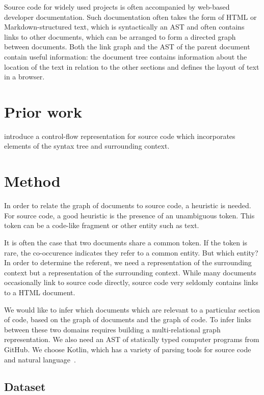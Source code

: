 \documentclass{article}
\begin{document}
Source code for widely used projects is often accompanied by web-based developer documentation. Such documentation often takes the form of HTML or Markdown-structured text, which is syntactically an AST and often contains links to other documents, which can be arranged to form a directed graph between documents. Both the link graph and the AST of the parent document contain useful information: the document tree contains information about the location of the text in relation to the other sections and defines the layout of text in a browser.

\section{Prior work}

\citet{si2018learning} introduce a control-flow representation for source code which incorporates elements of the syntax tree and surrounding context.

\section{Method}

In order to relate the graph of documents to source code, a heuristic is needed. For source code, a good heuristic is the presence of an unambiguous token. This token can be a code-like fragment or other entity such as text.

It is often the case that two documents share a common token. If the token is rare, the co-occurence indicates they refer to a common entity. But which entity? In order to determine the referent, we need a representation of the surrounding context but a representation of the surrounding context. While many documents occasionally link to source code directly, source code very seldomly contains links to a HTML document.

We would like to infer which documents which are relevant to a particular section of code, based on the graph of documents and the graph of code. To infer links between these two domains requires building a multi-relational graph representation. We also need an AST of statically typed computer programs from GitHub. We choose Kotlin, which has a variety of parsing tools for source code~\citep{kovalenko2019pathminer} and natural language~\citep{grella2018non}.

\subsection{Dataset}



\end{document}
